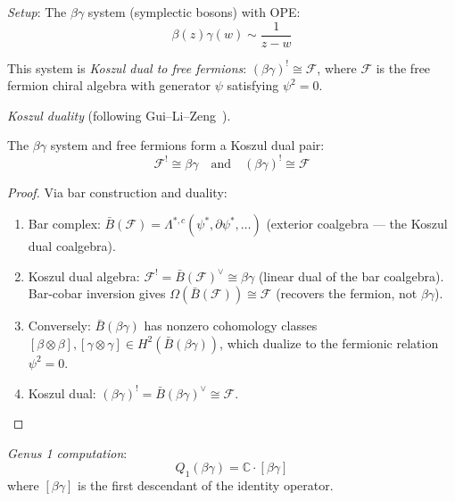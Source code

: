 \begin{example}
\label{ex:betagamma-fermion-koszul-duality}

\emph{Setup}: The $\beta\gamma$ system (symplectic bosons) with OPE:
\begin{equation}
\beta(z)\gamma(w) \sim \frac{1}{z-w}
\end{equation}

This system is \emph{Koszul dual to free fermions}: $(\beta\gamma)^! \cong \mathcal{F}$, 
where $\mathcal{F}$ is the free fermion chiral algebra with generator $\psi$ satisfying $\psi^2=0$.

\emph{Koszul duality} (following Gui--Li--Zeng~\cite{GLZ22}).

\begin{theorem}
\label{thm:fermion-boson-koszul-hg}
The $\beta\gamma$ system and free fermions form a Koszul dual pair:
\begin{equation}
\mathcal{F}^! \cong \beta\gamma \quad \text{and} \quad (\beta\gamma)^! \cong \mathcal{F}
\end{equation}
\end{theorem}

\begin{proof}
Via bar construction and duality:
\begin{enumerate}
\item Bar complex: $\bar{B}(\mathcal{F}) = \Lambda^{*,c}(\psi^*, \partial\psi^*, \ldots)$ (exterior coalgebra --- the Koszul dual coalgebra).
\item Koszul dual algebra: $\mathcal{F}^! = \bar{B}(\mathcal{F})^\vee \cong \beta\gamma$ (linear dual of the bar coalgebra).  Bar-cobar inversion gives $\Omega(\bar{B}(\mathcal{F})) \cong \mathcal{F}$ (recovers the fermion, not $\beta\gamma$).
\item Conversely: $\bar{B}(\beta\gamma)$ has nonzero cohomology classes $[\beta \otimes \beta], [\gamma \otimes \gamma] \in H^2(\bar{B}(\beta\gamma))$, which dualize to the fermionic relation $\psi^2 = 0$.
\item Koszul dual: $(\beta\gamma)^! = \bar{B}(\beta\gamma)^\vee \cong \mathcal{F}$.
\end{enumerate}
\end{proof}

\emph{Genus 1 computation}:
\begin{equation}
Q_1(\beta\gamma) = \mathbb{C} \cdot [\beta\gamma]
\end{equation}
where $[\beta\gamma]$ is the first descendant of the identity operator.


\end{example}
